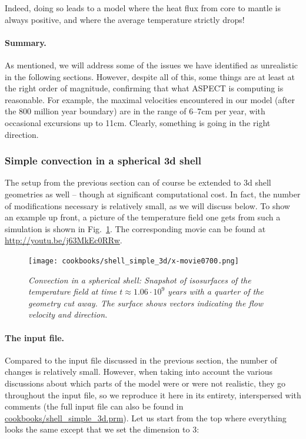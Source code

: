 \documentclass{article}
\newcommand{\aspect}{\textsc{ASPECT}}
\begin{document}
Indeed, doing so leads to a model where the heat flux from core to mantle is
always positive, and where the average temperature strictly drops!


\paragraph{Summary.} As mentioned, we will address some of the issues we have
identified as unrealistic in the following sections.
However, despite all of this, some things are at least at the right order of
magnitude, confirming that what \aspect{} is computing is reasonable. For
example, the maximal velocities encountered in our model (after the 800 million
year boundary) are in the range of 6--7cm per year, with occasional excursions
up to 11cm. Clearly, something is going in the right direction.


\subsubsection{Simple convection in a spherical 3d shell}
\label{sec:shell-simple-3d}

The setup from the previous section can of course be extended to 3d shell
geometries as well -- though at significant computational cost. In fact, the
number of modifications necessary is relatively small, as we will discuss below.
To show an example up front, a picture of the temperature field one gets from
such a simulation is shown in Fig.~\ref{fig:simple-shell-3d}. The
corresponding movie can be found at \url{http://youtu.be/j63MkEc0RRw}.

\begin{figure}[tb]
\centering
\texttt{[image: cookbooks/shell\_simple\_3d/x-movie0700.png]}
\caption{\it Convection in a spherical shell: Snapshot of
isosurfaces of the temperature field at time $t\approx 1.06\cdot 10^9$ years
with a quarter of the geometry cut away. The surface shows
vectors indicating the flow velocity and direction.}
\label{fig:simple-shell-3d}
\end{figure}

\paragraph{The input file.}
Compared to the input file discussed in the previous section, the number of
changes is relatively small. However, when taking into account the various
discussions about which parts of the model were or were not realistic, they go
throughout the input file, so we reproduce it here in its entirety, interspersed
with comments (the full input file can also be found in
\url{cookbooks/shell_simple_3d.prm}). Let us start from the top where everything
looks the same except that we set the dimension to 3:
\end{document}
